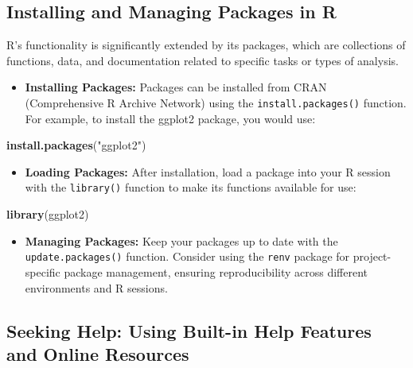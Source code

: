 \documentclass[
]{book}
\newenvironment{Shaded}{\begin{snugshade}}{\end{snugshade}}
\newcommand{\FunctionTok}[1]{\textcolor[rgb]{0.13,0.29,0.53}{\textbf{#1}}}
\newcommand{\NormalTok}[1]{#1}
\newcommand{\StringTok}[1]{\textcolor[rgb]{0.31,0.60,0.02}{#1}}
\providecommand{\tightlist}{%
  \setlength{\itemsep}{0pt}\setlength{\parskip}{0pt}}
\begin{document}
\subsection*{Installing and Managing Packages in R}\label{installing-and-managing-packages-in-r}

R's functionality is significantly extended by its packages, which are collections of functions, data, and documentation related to specific tasks or types of analysis.

\begin{itemize}
\tightlist
\item
  \textbf{Installing Packages:} Packages can be installed from CRAN (Comprehensive R Archive Network) using the \texttt{install.packages()} function. For example, to install the ggplot2 package, you would use:
\end{itemize}

\begin{Shaded}
\begin{Highlighting}[]
\FunctionTok{install.packages}\NormalTok{(}\StringTok{"ggplot2"}\NormalTok{)}
\end{Highlighting}
\end{Shaded}

\begin{itemize}
\tightlist
\item
  \textbf{Loading Packages:} After installation, load a package into your R session with the \texttt{library()} function to make its functions available for use:
\end{itemize}

\begin{Shaded}
\begin{Highlighting}[]
\FunctionTok{library}\NormalTok{(ggplot2)}
\end{Highlighting}
\end{Shaded}

\begin{itemize}
\tightlist
\item
  \textbf{Managing Packages:} Keep your packages up to date with the \texttt{update.packages()} function. Consider using the \texttt{renv} package for project-specific package management, ensuring reproducibility across different environments and R sessions.
\end{itemize}

\subsection*{Seeking Help: Using Built-in Help Features and Online Resources}\label{seeking-help-using-built-in-help-features-and-online-resources}
\end{document}
